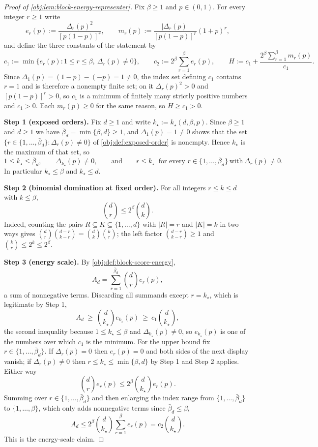 \begin{proof}[Proof of \cref{obj:lem:block-energy-representer}]
Fix \(\beta\ge1\) and \(p\in(0,1)\).  For every integer \(r\ge1\) write
\[
e_r(p):=\frac{\Delta_r(p)^2}{[p(1-p)]^r},
\qquad
m_r(p):=\frac{|\Delta_r(p)|}{[p(1-p)]^r}(1+p)^r ,
\]
and define the three constants of the statement by
\[
c_1:=\min\bigl\{e_r(p):1\le r\le\beta,\ \Delta_r(p)\ne0\bigr\},
\qquad
c_2:=2^\beta\sum_{r=1}^{\beta}e_r(p),
\qquad
H:=c_1+\frac{2^\beta\sum_{r=1}^{\beta}m_r(p)}{c_1}.
\]
Since \(\Delta_1(p)=(1-p)-(-p)=1\ne0\), the index set defining \(c_1\) contains \(r=1\) and is therefore a nonempty finite set; on it \(\Delta_r(p)^2>0\) and \([p(1-p)]^r>0\), so \(c_1\) is a minimum of finitely many strictly positive numbers and \(c_1>0\).  Each \(m_r(p)\ge0\) for the same reason, so \(H\ge c_1>0\). %

\textbf{Step 1 (exposed orders).}
Fix \(d\ge1\) and write \(k_\star:=k_\star(d,\beta,p)\).  Since \(\beta\ge1\) and \(d\ge1\) we have \(\bar\beta_d=\min\{\beta,d\}\ge1\), and \(\Delta_1(p)=1\ne0\) shows that the set \(\{r\in\{1,\ldots,\bar\beta_d\}:\Delta_r(p)\ne0\}\) of \cref{obj:def:exposed-order} is nonempty.  Hence \(k_\star\) is the maximum of that set, so
\[
1\le k_\star\le\bar\beta_d,
\qquad
\Delta_{k_\star}(p)\ne0,
\qquad\text{and}\qquad
r\le k_\star
\ \text{ for every } r\in\{1,\ldots,\bar\beta_d\}\ \text{with}\ \Delta_r(p)\ne0 .
\]
In particular \(k_\star\le\beta\) and \(k_\star\le d\). %

\textbf{Step 2 (binomial domination at fixed order).}
For all integers \(r\le k\le d\) with \(k\le\beta\),
\[
\binom d r\le 2^\beta\binom d k .
\]
Indeed, counting the pairs \(R\subseteq K\subseteq\{1,\ldots,d\}\) with \(|R|=r\) and \(|K|=k\) in two ways gives \(\binom d r\binom{d-r}{k-r}=\binom d k\binom k r\); the left factor \(\binom{d-r}{k-r}\ge1\) and \(\binom k r\le 2^k\le2^\beta\). %

\textbf{Step 3 (energy scale).}
By \cref{obj:def:block-score-energy},
\[
A_d=\sum_{r=1}^{\bar\beta_d}\binom d r e_r(p),
\]
a sum of nonnegative terms.  Discarding all summands except \(r=k_\star\), which is legitimate by Step 1,
\[
A_d\ \ge\ \binom{d}{k_\star}e_{k_\star}(p)\ \ge\ c_1\binom{d}{k_\star},
\]
the second inequality because \(1\le k_\star\le\beta\) and \(\Delta_{k_\star}(p)\ne0\), so \(e_{k_\star}(p)\) is one of the numbers over which \(c_1\) is the minimum.  For the upper bound fix \(r\in\{1,\ldots,\bar\beta_d\}\).  If \(\Delta_r(p)=0\) then \(e_r(p)=0\) and both sides of the next display vanish; if \(\Delta_r(p)\ne0\) then \(r\le k_\star\le\min\{\beta,d\}\) by Step 1 and Step 2 applies.  Either way
\[
\binom d r e_r(p)\le 2^\beta\binom{d}{k_\star}e_r(p).
\]
Summing over \(r\in\{1,\ldots,\bar\beta_d\}\) and then enlarging the index range from \(\{1,\ldots,\bar\beta_d\}\) to \(\{1,\ldots,\beta\}\), which only adds nonnegative terms since \(\bar\beta_d\le\beta\),
\[
A_d\le 2^\beta\binom{d}{k_\star}\sum_{r=1}^{\beta}e_r(p)=c_2\binom{d}{k_\star}.
\]
This is the energy-scale claim. %


\end{proof}
